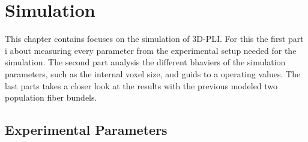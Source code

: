\setcounter{chapter}{7}
\chapter{Simulation}
\label{cha:simulation_analysis}
% 
% 
This chapter contains focuses on the simulation of \ac{3D-PLI}.
For this the first part i about measuring every parameter from the experimental setup needed for the simulation.
The second part analysis the different bhaviers of the simulation parameters, such as the internal voxel size, and guids to a operating values.
The last parts takes a closer look at the results with the previous modeled two population fiber bundels.
% 
\section{Experimental Parameters}
% 
% 
% 
